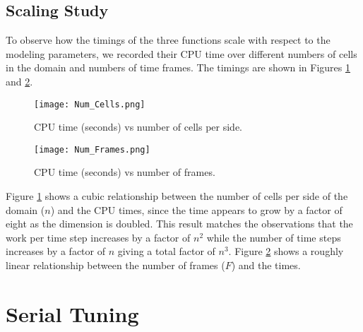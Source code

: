 \documentclass[12pt]{article}
\begin{document}
\subsection{Scaling Study}
To observe how the timings of the three functions scale with respect to the modeling parameters, we recorded their CPU time over different numbers of cells in the domain and numbers of time frames.
The timings are shown in Figures \ref{fig:Num_Cells} and \ref{fig:Num_Frames}.

\begin{center}
\begin{figure}[ht]
\texttt{[image: Num\_Cells.png]}
	\caption{CPU time (seconds) vs number of cells per side.}
	\label{fig:Num_Cells}
\end{figure}
\end{center}
\begin{center}
\begin{figure}[ht]
\texttt{[image: Num\_Frames.png]}
	\caption{CPU time (seconds) vs number of frames.}
	\label{fig:Num_Frames}
\end{figure}
\end{center}

Figure \ref{fig:Num_Cells} shows a cubic relationship between the number of cells per side of the domain ($n$) and the CPU times, since the time appears to grow by a factor of eight as the dimension is doubled.
This result matches the observations that the work per time step increases by a factor of $n^2$ while the number of time steps increases by a factor of $n$ giving a total factor of $n^3$.
Figure \ref{fig:Num_Frames} shows a roughly linear relationship between the number of frames ($F$) and the times.

\section{Serial Tuning}
\end{document}
